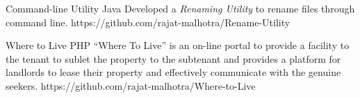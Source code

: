 



\begin{cvprojects}
\cvproject
{Command-line Utility}
{\textbullet{} Java \textbullet{}}
{
Developed a \textit{Renaming Utility} to rename files through command line. \vspace{2mm}
}
{https://github.com/rajat-malhotra/Rename-Utility}

\cvproject
{Where to Live}
{\textbullet{} PHP \textbullet{}}
{
“Where To Live” is an on-line portal to provide a facility to the tenant to sublet the property to the subtenant and provides a platform for landlords to lease their property and effectively communicate with the genuine seekers.
}
{https://github.com/rajat-malhotra/Where-to-Live}




\end{cvprojects}
